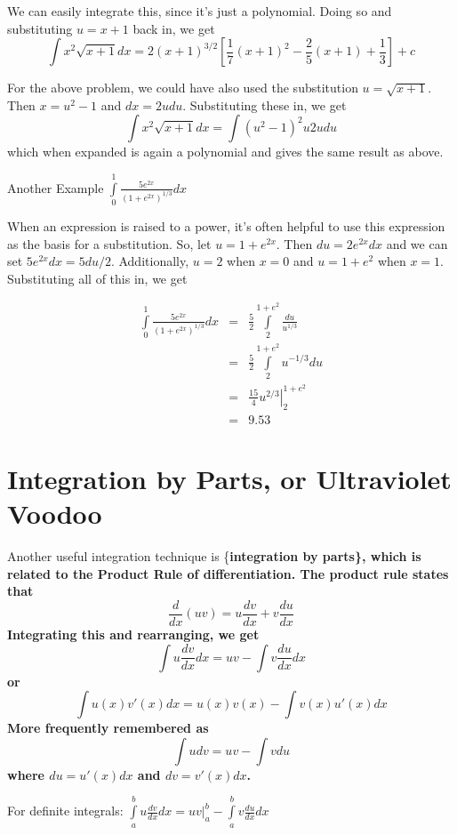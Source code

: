 \documentclass[]{book}
\theoremstyle{definition}
\theoremstyle{definition}
\theoremstyle{definition}
\theoremstyle{remark}
\begin{document}
We can easily integrate this, since it's just a polynomial. Doing so and
substituting \(u=x+1\) back in, we get
\[\int x^2\sqrt{x+1}dx=2(x+1)^{3/2}\left[\frac{1}{7}(x+1)^2 -
\frac{2}{5}(x+1)+\frac{1}{3}\right]+c\]

For the above problem, we could have also used the substitution
\(u=\sqrt{x+1}\). Then \(x=u^2-1\) and \(dx=2u du\). Substituting these
in, we get \[\int x^2\sqrt{x+1}dx=\int (u^2-1)^2 u 2u du\] which when
expanded is again a polynomial and gives the same result as above.

Another Example \(\int\limits_0^1 \frac{5e^{2x}}{(1+e^{2x})^{1/3}}dx\)

\vspace{6pt}

When an expression is raised to a power, it's often helpful to use this
expression as the basis for a substitution. So, let \(u=1+e^{2x}\). Then
\(du=2e^{2x}dx\) and we can set \(5e^{2x}dx=5du/2\). Additionally,
\(u=2\) when \(x=0\) and \(u=1+e^2\) when \(x=1\). Substituting all of
this in, we get

\begin{eqnarray}
            \int\limits_0^1 \frac{5e^{2x}}{(1+e^{2x})^{1/3}}dx
            &=& \frac{5}{2}\int\limits_2^{1+e^2}\frac{du}{u^{1/3}}\nonumber\\
            &=& \frac{5}{2}\int\limits_2^{1+e^2} u^{-1/3}du\nonumber\\
            &=& \left. \frac{15}{4} u^{2/3} \right|_2^{1+e^2}\nonumber\\
            &=& 9.53\nonumber
\end{eqnarray}

\section{Integration by Parts, or Ultraviolet
Voodoo}\label{integration-by-parts-or-ultraviolet-voodoo}

Another useful integration technique is \{\bf integration by parts\},
which is related to the Product Rule of differentiation. The product
rule states that \[\frac{d}{dx}(uv)=u\frac{dv}{dx}+v\frac{du}{dx}\]
Integrating this and rearranging, we get
\[\int u\frac{dv}{dx}dx= u v - \int v \frac{du}{dx}dx\] or
\[\int u(x) v'(x)dx=u(x)v(x) - \int v(x)u'(x)dx\] More frequently
remembered as \[\int u dv = u v - \int v du\] where \(du=u'(x)dx\) and
\(dv=v'(x)dx\).

For definite integrals:
\(\int\limits_a^b u\frac{dv}{dx}dx = \left. u v \right|_a^b - \int\limits_a^b v \frac{du}{dx}dx\)
\end{document}
